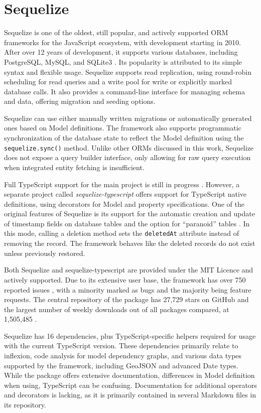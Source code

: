\section{Sequelize}

Sequelize is one of the oldest, still popular, and actively supported ORM
frameworks for the JavaScript ecosystem, with development starting in 2010.
After over 12 years of development, it supports various databases, including
PostgreSQL, MySQL, and SQLite3 \cite{sequelizeDocs}. Its popularity is
attributed to its simple syntax and flexible usage. Sequelize supports read
replication, using round-robin scheduling for read queries and a write pool for
write or explicitly marked database calls. It also provides a command-line
interface for managing schema and data, offering migration and seeding options.

Sequelize can use either manually written migrations or automatically generated
ones based on Model definitions. The framework also supports programmatic
synchronization of the database state to reflect the Model definition using the
\texttt{sequelize.sync()} method. Unlike other ORMs discussed in this work,
Sequelize does not expose a query builder interface, only allowing for raw query
execution when integrated entity fetching is insufficient.

Full TypeScript support for the main project is still in progress
\cite{sequelizeTypescriptSupport}. However, a separate project called
\textit{sequelize-typescript} \cite{sequelizeTypescriptNpm} offers support for
TypeScript native definitions, using decorators for Model and property
specifications. One of the original features of Sequelize is its support for the
automatic creation and update of timestamp fields on database tables and the
option for \enquote{paranoid} tables \cite{sequelizeParanoid}. In this mode,
calling a deletion method sets the \texttt{deletedAt} attribute instead of
removing the record. The framework behaves like the deleted records do not exist
unless previously restored.

Both Sequelize and sequelize-typescript are provided under the MIT Licence and
actively supported. Due to its extensive user base, the framework has over 750
reported issues \cite{sequelizeGitHub}, with a minority marked as bugs and the
majority being feature requests. The central repository of the package has
27,729 stars on GitHub and the largest number of weekly downloads out of all
packages compared, at 1,505,485 \cite{sequelizeNpm}.

Sequelize has 16 dependencies, plus TypeScript-specific helpers required for
usage with the current TypeScript version. These dependencies primarily relate
to inflexion, code analysis for model dependency graphs, and various data types
supported by the framework, including GeoJSON and advanced Date types. While the
package offers extensive documentation, differences in Model definition when
using, TypeScript can be confusing. Documentation for additional operators and
decorators is lacking, as it is primarily contained in several Markdown files in
its repository.

